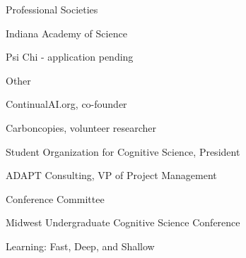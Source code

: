 
\begin{cventries}

  \cventry
    {Professional Societies} %
    {} %
    {} %
    {} %
    {
      \begin{cvitems} %
        \item {Indiana Academy of Science}
	\item{Psi Chi - application pending}
      \end{cvitems}
    }

  \cventry
    {Other} %
    {} %
    {} %
    {} %
    {
      \begin{cvitems} %
        \item {ContinualAI.org, co-founder}
	\item {Carboncopies, volunteer researcher}
	\item {Student Organization for Cognitive Science, President}
	\item {ADAPT Consulting, VP of Project Management}
      \end{cvitems}
    }

 \cventry
    {Conference Committee} %
    {} %
    {} %
    {} %
    {
      \begin{cvitems} %
        \item {Midwest Undergraduate Cognitive Science Conference}
	\item{Learning: Fast, Deep, and Shallow}
      \end{cvitems}
    }
\end{cventries}

